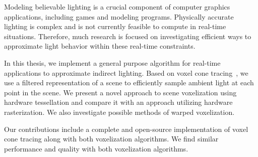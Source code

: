 Modeling believable lighting is a crucial component of computer graphics applications, including games and modeling programs. Physically accurate lighting is complex and is not currently feasible to compute in real-time situations. Therefore, much research is focused on investigating efficient ways to approximate light behavior within these real-time constraints.

In this thesis, we implement a general purpose algorithm for real-time applications to approximate indirect lighting. Based on voxel cone tracing~\cite{crassin2011interactive}, we use a filtered representation of a scene to efficiently sample ambient light at each point in the scene. We present a novel approach to scene voxelization using hardware tessellation and compare it with an approach utilizing hardware rasterization. We also investigate possible methods of warped voxelization.

Our contributions include a complete and open-source implementation of voxel cone tracing along with both voxelization algorithms. We find similar performance and quality with both voxelization algorithms.


